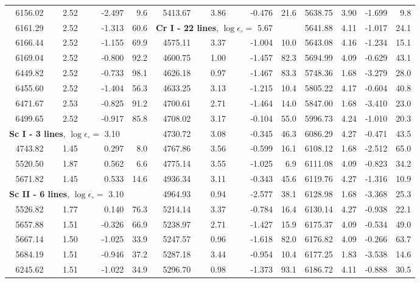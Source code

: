 \documentclass[oldversion]{aa}
\begin{document}
\begin{table}[!t]
\begin{tabular}{c c r r | c c r r | c c r r}
6156.02 & 2.52 & -2.497 &   9.6 & 5413.67 & 3.86 & -0.476 &  21.6 & 5638.75 & 3.90 & -1.699 &   9.8\\
6161.29 & 2.52 & -1.313 &  60.6 & \multicolumn{3}{l}{\textbf{Cr I - 22 lines}, $\log\epsilon_\circ=$ 5.67} & & 5641.88 & 4.11 & -1.017 &  24.1\\
6166.44 & 2.52 & -1.155 &  69.9 & 4575.11 & 3.37 & -1.004 &  10.0 & 5643.08 & 4.16 & -1.234 &  15.1\\
6169.04 & 2.52 & -0.800 &  92.2 & 4600.75 & 1.00 & -1.457 &  82.3 & 5694.99 & 4.09 & -0.629 &  43.1\\
6449.82 & 2.52 & -0.733 &  98.1 & 4626.18 & 0.97 & -1.467 &  83.3 & 5748.36 & 1.68 & -3.279 &  28.0\\
6455.60 & 2.52 & -1.404 &  56.3 & 4633.25 & 3.13 & -1.215 &  10.4 & 5805.22 & 4.17 & -0.604 &  40.8\\
6471.67 & 2.53 & -0.825 &  91.2 & 4700.61 & 2.71 & -1.464 &  14.0 & 5847.00 & 1.68 & -3.410 &  23.0\\
6499.65 & 2.52 & -0.917 &  85.8 & 4708.02 & 3.17 & -0.104 &  55.0 & 5996.73 & 4.24 & -1.010 &  20.3\\
\multicolumn{3}{l}{\textbf{Sc I - 3 lines}, $\log\epsilon_\circ=$ 3.10} & & 4730.72 & 3.08 & -0.345 &  46.3 & 6086.29 & 4.27 & -0.471 &  43.5\\
4743.82 & 1.45 &  0.297 &   8.0 & 4767.86 & 3.56 & -0.599 &  16.1 & 6108.12 & 1.68 & -2.512 &  65.0\\
5520.50 & 1.87 &  0.562 &   6.6 & 4775.14 & 3.55 & -1.025 &   6.9 & 6111.08 & 4.09 & -0.823 &  34.2\\
5671.82 & 1.45 &  0.533 &  14.6 & 4936.34 & 3.11 & -0.343 &  45.6 & 6119.76 & 4.27 & -1.316 &  10.9\\
\multicolumn{3}{l}{\textbf{Sc II - 6 lines}, $\log\epsilon_\circ=$ 3.10} & & 4964.93 & 0.94 & -2.577 &  38.1 & 6128.98 & 1.68 & -3.368 &  25.3\\
5526.82 & 1.77 &  0.140 &  76.3 & 5214.14 & 3.37 & -0.784 &  16.4 & 6130.14 & 4.27 & -0.938 &  22.1\\
5657.88 & 1.51 & -0.326 &  66.9 & 5238.97 & 2.71 & -1.427 &  15.9 & 6175.37 & 4.09 & -0.534 &  49.0\\
5667.14 & 1.50 & -1.025 &  33.9 & 5247.57 & 0.96 & -1.618 &  82.0 & 6176.82 & 4.09 & -0.266 &  63.7\\
5684.19 & 1.51 & -0.946 &  37.2 & 5287.18 & 3.44 & -0.954 &  10.4 & 6177.25 & 1.83 & -3.538 &  14.6\\
6245.62 & 1.51 & -1.022 &  34.9 & 5296.70 & 0.98 & -1.373 &  93.1 & 6186.72 & 4.11 & -0.888 &  30.5\\

\end{tabular}
\end{table}
\end{document}
